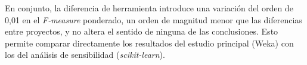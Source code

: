 En conjunto, la diferencia de herramienta introduce una variación del orden de 0,01 en el \textit{F-measure} ponderado, un orden de magnitud menor que las diferencias entre proyectos, y no altera el sentido de ninguna de las conclusiones. Esto permite comparar directamente los resultados del estudio principal (Weka) con los del análisis de sensibilidad (\textit{scikit-learn}).
